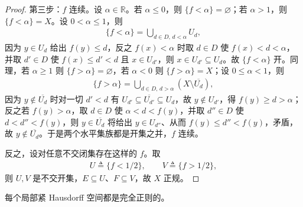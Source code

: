 \documentclass[../main.tex]{subfiles}
\begin{document}
\begin{proof}
第三步：$f$ 连续。设 $\alpha\in\mathbb{R}$。若 $\alpha\leqslant0$，则 $\{f<\alpha\}=\varnothing$；若 $\alpha>1$，则 $\{f<\alpha\}=X$。设 $0<\alpha\leqslant1$，则
\begin{align*}
\{f<\alpha\}=\bigcup_{d\in D,\,d<\alpha}U_d,
\end{align*}
因为 $y\in U_d$ 给出 $f(y)\leqslant d$，反之 $f(x)<\alpha$ 时取 $d\in D$ 使 $f(x)<d<\alpha$，并取 $d'\in D$ 使 $f(x)\leqslant d'<d$ 且 $x\in U_{d'}$，则 $x\in U_{d'}\subseteq U_d$。故 $\{f<\alpha\}$ 开。同理，若 $\alpha\geqslant1$ 则 $\{f>\alpha\}=\varnothing$，若 $\alpha<0$ 则 $\{f>\alpha\}=X$；设 $0\leqslant\alpha<1$，则
\begin{align*}
\{f>\alpha\}=\bigcup_{d\in D,\,d>\alpha}(X\setminus\overline{U_d}),
\end{align*}
因为 $y\notin\overline{U_d}$ 时对一切 $d'<d$ 有 $U_{d'}\subseteq\overline{U_{d'}}\subseteq U_d$，故 $y\notin U_{d'}$，得 $f(y)\geqslant d>\alpha$；反之若 $f(y)>\alpha$，取 $d\in D$ 使 $\alpha<d<f(y)$，并取 $d''\in D$ 使 $d<d''<f(y)$，则 $y\in\overline{U_d}$ 将给出 $y\in U_{d''}$、从而 $f(y)\leqslant d''<f(y)$，矛盾，故 $y\notin\overline{U_d}$。于是两个水平集族都是开集之并，$f$ 连续。

反之，设对任意不交闭集存在这样的 $f$。取
\begin{align*}
U\triangleq\{f<1/2\},\qquad V\triangleq\{f>1/2\},
\end{align*}
则 $U,V$ 是不交开集，$E\subseteq U$、$F\subseteq V$，故 $X$ 正规。
\end{proof}

\begin{corollary}\label{corollary:appA-局部紧完全正则}
每个局部紧 Hausdorff 空间都是完全正则的。
\end{corollary}
\end{document}
